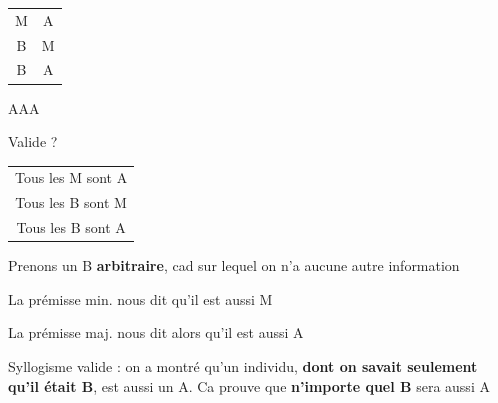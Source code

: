 \begin{frame}
	
	\begin{description}[labelindent=6pt,style=multiline,leftmargin=1.3in]
		 \setlength\itemsep{1em}

\item[$1^{\grave{e}re}$ figure] \begin{tabular}{cc}
M & A \\
	B & M \\
\cline{1-2}
		B & A \\
\end{tabular}
\item[Mode] AAA \pause
\item[Question] Valide ? 

	\end{description} 
\end{frame}



\begin{frame}
	
	\begin{description}[labelindent=6pt,style=multiline,leftmargin=1.3in]
		 \setlength\itemsep{1em}

\item[Mode + figure] \begin{tabular}{c}
Tous les M sont A\\ 
Tous les B sont M\\ 
\cline{1-1}
Tous les B sont A
\end{tabular} \newline
	\end{description}
	
Prenons un B \textbf{arbitraire}\pause, cad sur lequel on n'a aucune autre information \pause
\newline 

La prémisse min. nous dit qu'il est aussi M\pause
\newline

La prémisse maj. nous dit alors qu'il est aussi A\pause \newline

Syllogisme valide \pause : on a montré qu'un individu, \textbf{dont on savait seulement qu'il était B}, est aussi un A. \pause Ca prouve que \textbf{n'importe quel B} sera aussi A

\end{frame}


